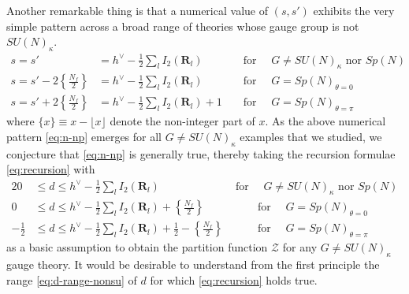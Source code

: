 \documentclass[letterpaper, 11pt]{article}
\newcommand{\nn}{\nonumber}
\def\k{\kappa}
\begin{document}
{Another remarkable thing is that a numerical value of  $(s, s')$ exhibits the very simple pattern across a broad range of theories whose gauge group is not $SU(N)_\k$. %
\begin{align}
  \label{eq:n-np}
 s = s' &= h^\vee - \frac{1}{2} \sum_{l}I_2(\mathbf{R}_l)  && \text{ for } \quad   G\neq SU(N)_\kappa \text{ nor } Sp(N) \nn \\
 s = s' - 2\left\{\frac{N_f}{2} \right\} &= h^\vee - \frac{1}{2} \sum_{l}I_2(\mathbf{R}_l)
 &&   \text{ for }  \quad G = Sp(N)_{\theta=0}\\
 s = s' + 2 \left\{\frac{N_f}{2} \right\} &= h^\vee - \frac{1}{2} \sum_{l}I_2(\mathbf{R}_l) + 1 &&   \text{ for }  \quad G = Sp(N)_{\theta=\pi} \nn
\end{align}
where $\{ x\} \equiv x - \lfloor x \rfloor $ denote the non-integer part of $x$.
As the above numerical pattern \eqref{eq:n-np} emerges for all $G \neq SU(N)_\k$ examples that we studied, we conjecture that \eqref{eq:n-np} is generally true, thereby taking the recursion formulae \eqref{eq:recursion} with
\begin{alignat}{2}
 \label{eq:d-range-nonsu}
  0 & \leq d \leq h^\vee - \frac{1}{2} \sum_{l}I_2(\mathbf{R}_l)  & \text{ for } \quad G \neq SU(N)_\kappa \text{ nor } Sp(N)  \nn \\
  0 &\leq  d \leq h^\vee - \frac{1}{2} \sum_{l}I_2(\mathbf{R}_l) + \left\{\frac{N_f}{2} \right\} & \qquad \text{ for }\quad G =Sp(N)_{\theta=0} \\
  -\frac{1}{2} &\leq  d \leq h^\vee - \frac{1}{2} \sum_{l}I_2(\mathbf{R}_l) + \frac{1}{2} - \left\{\frac{N_f}{2} \right\} & \qquad \text{ for }\quad G =Sp(N)_{\theta=\pi} \nn
\end{alignat}
as a basic assumption to obtain the partition function $\mathcal{Z}$ for any $G \neq SU(N)_\k$ gauge theory. 
It would be desirable to understand from the first principle the range  \eqref{eq:d-range-nonsu} of $d$ for which \eqref{eq:recursion} holds true.

}
\end{document}
